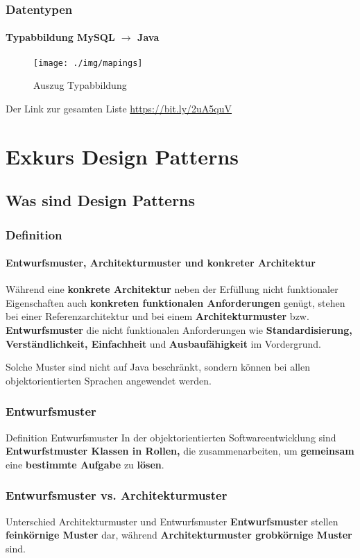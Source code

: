 \documentclass[class=beamer, crop=false]{standalone}
\begin{document}
\begin{frame}
	\frametitle{Datentypen}
	\framesubtitle{Typabbildung MySQL $\rightarrow$ Java}
	\begin{center}
	\begin{figure}
  		\texttt{[image: ./img/mapings]}
  		\caption{Auszug Typabbildung}
  		\label{Auszug Typabbildung}
	\end{figure}
		\small{Der Link zur gesamten Liste \url{https://bit.ly/2uA5quV}}
	\end{center}
\end{frame}

\section{Exkurs Design Patterns}
\subsection{Was sind Design Patterns}

\begin{frame}
\frametitle{Definition}
\framesubtitle{Entwurfsmuster, Architekturmuster und konkreter Architektur}
	\begin{block}{%
	}
		Während eine \textbf{konkrete Architektur} neben der Erfüllung nicht funktionaler Eigenschaften auch \textbf{konkreten funktionalen Anforderungen} genügt, stehen bei einer Referenzarchitektur und bei einem \textbf{Architekturmuster} bzw. \textbf{Entwurfsmuster} die nicht funktionalen Anforderungen  wie \textbf{Standardisierung, Verständlichkeit, Einfachheit} und \textbf{Ausbaufähigkeit} im Vordergrund. \cite{architektur}
	\end{block}
	
	Solche Muster sind nicht auf Java beschränkt, sondern können bei allen objektorientierten Sprachen angewendet werden.	
\end{frame}

\begin{frame}
\frametitle{Entwurfsmuster}
	\begin{block}{Definition Entwurfsmuster}
		In der objektorientierten Softwareentwicklung sind \textbf{Entwurfstmuster Klassen in Rollen,} die zusammenarbeiten, um \textbf{gemeinsam} eine \textbf{bestimmte Aufgabe} zu \textbf{lösen}.\cite{architektur}	\end{block}
\end{frame}

\begin{frame}
\frametitle{Entwurfsmuster vs. Architekturmuster}
	\begin{block}{Unterschied Architekturmuster und Entwurfsmuster}
		\textbf{Entwurfsmuster} stellen \textbf{feinkörnige Muster} dar, während \textbf{Architekturmuster grobkörnige Muster} sind. \cite{architektur}
	\end{block}
\end{frame}
\end{document}
